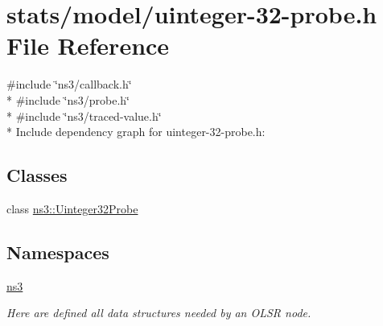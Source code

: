 \hypertarget{uinteger-32-probe_8h}{}\section{stats/model/uinteger-\/32-\/probe.h File Reference}
\label{uinteger-32-probe_8h}
{\ttfamily \#include \char`\"{}ns3/callback.\+h\char`\"{}}\\*
{\ttfamily \#include \char`\"{}ns3/probe.\+h\char`\"{}}\\*
{\ttfamily \#include \char`\"{}ns3/traced-\/value.\+h\char`\"{}}\\*
Include dependency graph for uinteger-\/32-\/probe.h\+:
\subsection*{Classes}
\begin{DoxyCompactItemize}
\item 
class \hyperlink{classns3_1_1Uinteger32Probe}{ns3\+::\+Uinteger32\+Probe}
\end{DoxyCompactItemize}
\subsection*{Namespaces}
\begin{DoxyCompactItemize}
\item 
 \hyperlink{namespacens3}{ns3}
\begin{DoxyCompactList}\small\item\em Here are defined all data structures needed by an O\+L\+SR node. \end{DoxyCompactList}\end{DoxyCompactItemize}
